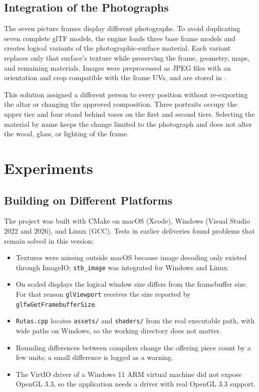 \documentclass[letter,12pt]{article}
\begin{document}
	\subsection{Integration of the Photographs}
	The seven picture frames display different photographs. To avoid duplicating seven complete glTF models, the engine loads three base frame models and creates logical variants of the photographic-surface material. Each variant replaces only that surface's texture while preserving the frame, geometry, maps, and remaining materials. Images were preprocessed as JPEG files with an orientation and crop compatible with the frame UVs, and are stored in .

	This solution assigned a different person to every position without re-exporting the altar or changing the approved composition. Three portraits occupy the upper tier and four stand behind vases on the first and second tiers. Selecting the material by name keeps the change limited to the photograph and does not alter the wood, glass, or lighting of the frame.

	\section{Experiments}

	\subsection{Building on Different Platforms}
	The project was built with CMake on macOS (Xcode), Windows (Visual Studio 2022 and 2026), and Linux (GCC). Tests in earlier deliveries found problems that remain solved in this version:
	\begin{itemize}[leftmargin=*]
		\item Textures were missing outside macOS because image decoding only existed through ImageIO; \texttt{stb\_image} was integrated for Windows and Linux.
		\item On scaled displays the logical window size differs from the framebuffer size. For that reason \texttt{glViewport} receives the size reported by \texttt{glfwGetFramebufferSize}.
		\item \texttt{Rutas.cpp} locates \texttt{assets/} and \texttt{shaders/} from the real executable path, with wide paths on Windows, so the working directory does not matter.
		\item Rounding differences between compilers change the offering piece count by a few units; a small difference is logged as a warning.
		\item The VirtIO driver of a Windows 11 ARM virtual machine did not expose OpenGL 3.3, so the application needs a driver with real OpenGL 3.3 support.
	\end{itemize}
\end{document}
